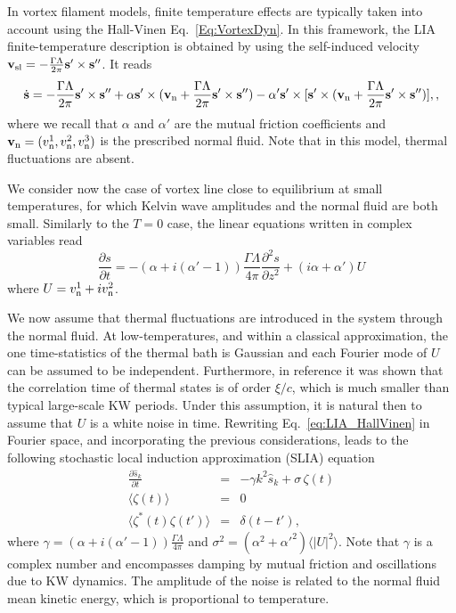 \documentclass[sn-mathphys]{sn-jnl}%
\def\sk{\hat{s}_k}
\begin{document}
In vortex filament models, finite temperature effects are typically taken into account using the Hall-Vinen Eq.~\eqref{Eq:VortexDyn}. In this framework, the LIA finite-temperature description is obtained by using the self-induced velocity ${\bf v}_{\rm sl}=-\frac{\Gamma \Lambda}{2\pi}{\bf s}'\times {\bf s}''$. It reads
\begin{equation} 
    \dot{{\bf s}}=-\frac{\Gamma \Lambda}{2\pi}{\bf s}'\times {\bf s}''+\alpha {\bf s'}\times({\bf v}_{\rm n}+\frac{\Gamma \Lambda}{2\pi}{\bf s}'\times {\bf s}'')-\alpha'{\bf s'}\times[{\bf s}'\times({\bf v}_{\rm n}+\frac{\Gamma \Lambda}{2\pi}{\bf s}'\times {\bf s}'')],\label{Eq:VortexDynLIA},
    \end{equation}
where we recall that $\alpha$ and $\alpha'$ are the mutual friction coefficients and ${\bf v}_{\rm n}=(v_{\rm n}^1,v_{\rm n}^2,v_{\rm n}^3)$ is the prescribed normal fluid. Note that in this model, thermal fluctuations are absent. 

We consider now the case of vortex line close to equilibrium at small temperatures, for which Kelvin wave amplitudes and the normal fluid are both small. Similarly to the $T=0$ case, the linear equations written in complex variables read
\begin{equation}\label{eq:LIA_HallVinen}
    \frac{\partial s}{\partial t}=-(\alpha +i(\alpha'-1))\frac{\Gamma \Lambda}{4\pi}\frac{\partial^2s}{\partial z^2}+ (i\alpha+\alpha')U
\end{equation}
where $U=v_{\rm n}^1+iv_{\rm n}^2$.

We now assume that thermal fluctuations are introduced in the system through the normal fluid. At low-temperatures, and within a classical approximation, the one time-statistics of the thermal bath is Gaussian and each Fourier mode of $U$ can be assumed to be independent. Furthermore, in reference \cite{Giuriato_2021} it was shown that the correlation time of thermal states is of order $\xi/c$, which is much smaller than typical large-scale KW periods. Under this assumption, it is natural then to assume that $U$ is a white noise in time. Rewriting Eq.~\eqref{eq:LIA_HallVinen} in Fourier space, and incorporating the previous considerations, leads to the following stochastic local induction approximation (SLIA) equation
 \begin{eqnarray}\label{eq:StochasticLIA}
     \frac{\partial \sk}{\partial t}&=&-\gamma k^2\sk+ \sigma\, \zeta(t)\\
     \langle \zeta(t)\rangle&=&0\\
     \langle \zeta^*(t)\zeta(t')\rangle&=&\delta(t-t'),
 \end{eqnarray}
where $\gamma=(\alpha +i(\alpha'-1))\frac{\Gamma \Lambda}{4\pi}$ and $\sigma^2= (\alpha^2+\alpha'^2)\langle\lvert U\lvert^2\rangle$. Note that $\gamma$ is a complex number and encompasses damping by mutual friction and oscillations due to KW dynamics. The amplitude of the noise is related to the normal fluid mean kinetic energy, which is proportional to temperature.
\end{document}
